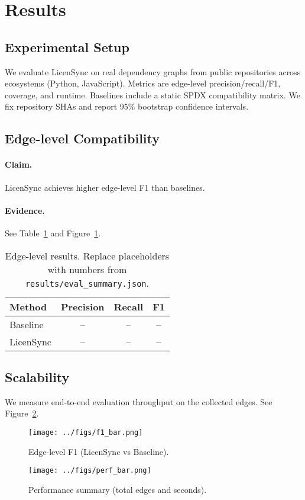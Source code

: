 \section{Results}
\subsection{Experimental Setup}
We evaluate LicenSync on real dependency graphs from public repositories across ecosystems (Python, JavaScript).
Metrics are edge-level precision/recall/F1, coverage, and runtime. Baselines include a static SPDX compatibility
matrix. We fix repository SHAs and report 95\% bootstrap confidence intervals.

\subsection{Edge-level Compatibility}
\paragraph{Claim.} LicenSync achieves higher edge-level F1 than baselines.
\paragraph{Evidence.} See Table~\ref{tab:edge-f1} and Figure~\ref{fig:f1bar}.

\begin{table}[h]
\centering
\caption{Edge-level results. Replace placeholders with numbers from \texttt{results/eval\_summary.json}.}
\label{tab:edge-f1}
\begin{tabular}{lccc}
\toprule
Method & Precision & Recall & F1 \\
\midrule
Baseline & -- & -- & -- \\
LicenSync & -- & -- & -- \\
\bottomrule
\end{tabular}
\end{table}

\subsection{Scalability}
We measure end-to-end evaluation throughput on the collected edges.
See Figure~\ref{fig:perfbar}.

\begin{figure}[h]
\centering
\texttt{[image: ../figs/f1\_bar.png]}
\caption{Edge-level F1 (LicenSync vs Baseline).}
\label{fig:f1bar}
\end{figure}

\begin{figure}[h]
\centering
\texttt{[image: ../figs/perf\_bar.png]}
\caption{Performance summary (total edges and seconds).}
\label{fig:perfbar}
\end{figure}
